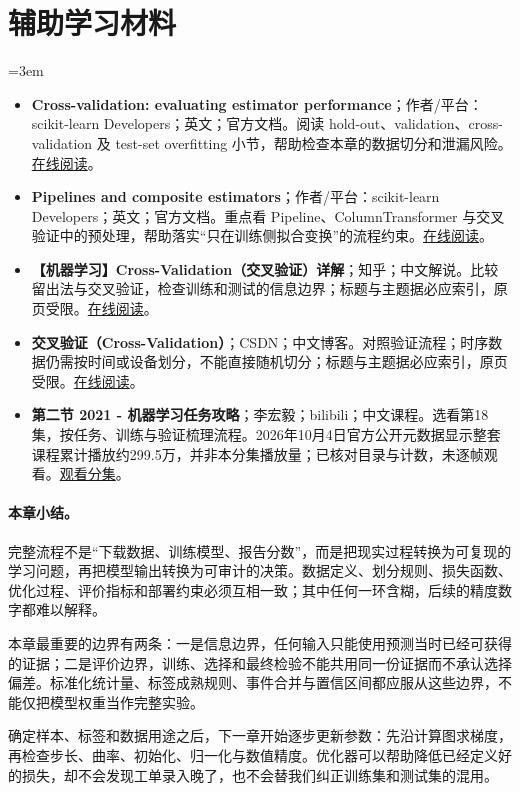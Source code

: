 \section*{辅助学习材料}
\begingroup
\emergencystretch=3em
\begin{itemize}
\item \textbf{Cross-validation: evaluating estimator performance}；作者/平台：scikit-learn Developers；英文；官方文档。阅读 hold-out、validation、cross-validation 及 test-set overfitting 小节，帮助检查本章的数据切分和泄漏风险。\href{https://scikit-learn.org/stable/modules/cross\_validation.html}{在线阅读}。
\item \textbf{Pipelines and composite estimators}；作者/平台：scikit-learn Developers；英文；官方文档。重点看 Pipeline、ColumnTransformer 与交叉验证中的预处理，帮助落实“只在训练侧拟合变换”的流程约束。\href{https://scikit-learn.org/stable/modules/compose.html}{在线阅读}。
\item \textbf{【机器学习】Cross-Validation（交叉验证）详解}；知乎；中文解说。比较留出法与交叉验证，检查训练和测试的信息边界；标题与主题据必应索引，原页受限。\href{https://zhuanlan.zhihu.com/p/24825503}{在线阅读}。
\item \textbf{交叉验证（Cross-Validation）}；CSDN；中文博客。对照验证流程；时序数据仍需按时间或设备划分，不能直接随机切分；标题与主题据必应索引，原页受限。\href{https://blog.csdn.net/weixin\_42691585/article/details/113971857}{在线阅读}。
\item \textbf{第二节 2021 - 机器学习任务攻略}；李宏毅；bilibili；中文课程。选看第18集，按任务、训练与验证梳理流程。2026年10月4日官方公开元数据显示整套课程累计播放约299.5万，并非本分集播放量；已核对目录与计数，未逐帧观看。\href{https://www.bilibili.com/video/BV1Wv411h7kN/?p=18}{观看分集}。
\end{itemize}
\endgroup
\paragraph{本章小结。}
完整流程不是“下载数据、训练模型、报告分数”，而是把现实过程转换为可复现的学习问题，再把模型输出转换为可审计的决策。数据定义、划分规则、损失函数、优化过程、评价指标和部署约束必须互相一致；其中任何一环含糊，后续的精度数字都难以解释。

本章最重要的边界有两条：一是信息边界，任何输入只能使用预测当时已经可获得的证据；二是评价边界，训练、选择和最终检验不能共用同一份证据而不承认选择偏差。标准化统计量、标签成熟规则、事件合并与置信区间都应服从这些边界，不能仅把模型权重当作完整实验。

确定样本、标签和数据用途之后，下一章开始逐步更新参数：先沿计算图求梯度，再检查步长、曲率、初始化、归一化与数值精度。优化器可以帮助降低已经定义好的损失，却不会发现工单录入晚了，也不会替我们纠正训练集和测试集的混用。
